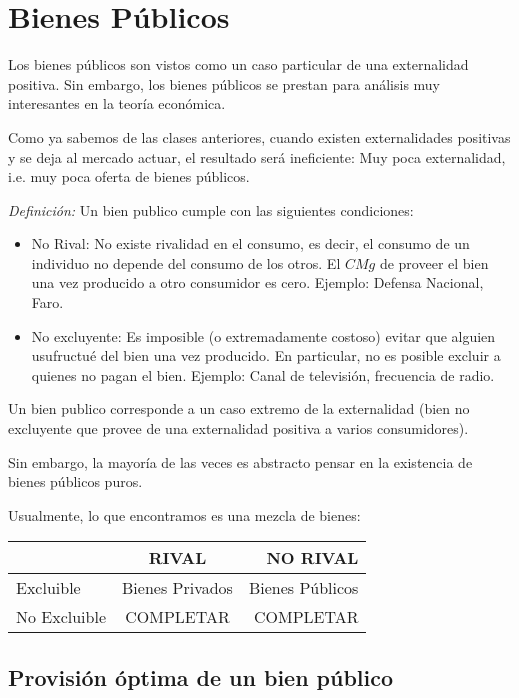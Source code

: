 
\section{Bienes Públicos}

Los bienes públicos son vistos como un caso particular de una externalidad 
positiva. Sin embargo, los bienes públicos se prestan para análisis muy 
interesantes en la teoría económica. 
 
Como ya sabemos de las clases anteriores, cuando existen externalidades 
positivas y se deja al mercado actuar,  el resultado será ineficiente: Muy poca 
externalidad, i.e. muy poca oferta de bienes públicos. 
 
\emph{Definición:} Un bien publico cumple con las siguientes
condiciones:

\begin{itemize}
\item No Rival: No existe rivalidad en el consumo, es decir, el
consumo de un individuo no depende del consumo de los otros. El
$CMg$ de proveer el bien una vez producido a otro consumidor es
cero. Ejemplo: Defensa Nacional, Faro.
\item No excluyente: Es imposible (o extremadamente costoso) evitar
que alguien usufructué del bien una vez producido. En particular, no
es posible excluir a quienes no pagan el bien. Ejemplo: Canal de
televisión, frecuencia de radio.
\end{itemize}


Un bien publico corresponde a un caso extremo de la externalidad
(bien no excluyente que provee de una externalidad positiva a varios
consumidores).

Sin embargo, la mayoría de las veces es abstracto pensar en la existencia de 
bienes públicos puros. 


Usualmente, lo que encontramos es una mezcla de bienes: 


\begin{tabular}{||l | c | r||}
\hline
\hline
 & RIVAL & NO RIVAL \\
\hline
Excluible & Bienes Privados & Bienes Públicos\\
\hline
No Excluible & COMPLETAR & COMPLETAR\\
\hline
\end{tabular}
 
\subsection{Provisión óptima de un bien público}

